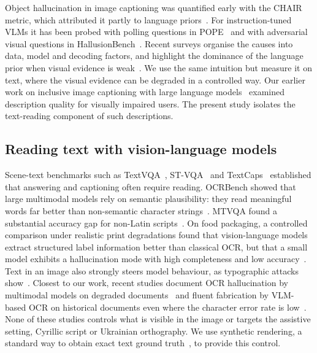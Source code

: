 Object hallucination in image captioning was quantified early with the CHAIR metric, which attributed it partly to language priors~\cite{rohrbach2018object}. For instruction-tuned VLMs it has been probed with polling questions in POPE~\cite{li2023evaluating} and with adversarial visual questions in HallusionBench~\cite{guan2024hallusionbench}. Recent surveys organise the causes into data, model and decoding factors, and highlight the dominance of the language prior when visual evidence is weak~\cite{bai2024hallucination,liu2024survey}. We use the same intuition but measure it on text, where the visual evidence can be degraded in a controlled way. Our earlier work on inclusive image captioning with large language models~\cite{zatserkovnyi2025llm} examined description quality for visually impaired users. The present study isolates the text-reading component of such descriptions.

\subsection{Reading text with vision-language models}

Scene-text benchmarks such as TextVQA~\cite{singh2019towards}, ST-VQA~\cite{biten2019scene} and TextCaps~\cite{sidorov2020textcaps} established that answering and captioning often require reading. OCRBench showed that large multimodal models rely on semantic plausibility: they read meaningful words far better than non-semantic character strings~\cite{liu2024ocrbench}. MTVQA found a substantial accuracy gap for non-Latin scripts~\cite{tang2025mtvqa}. On food packaging, a controlled comparison under realistic print degradations found that vision-language models extract structured label information better than classical OCR, but that a small model exhibits a hallucination mode with high completeness and low accuracy~\cite{zatserkovna2026packaging}. Text in an image also strongly steers model behaviour, as typographic attacks show~\cite{cheng2024unveiling}. Closest to our work, recent studies document OCR hallucination by multimodal models on degraded documents~\cite{he2025seeing} and fluent fabrication by VLM-based OCR on historical documents even where the character error rate is low~\cite{gardella2026low}. None of these studies controls what is visible in the image or targets the assistive setting, Cyrillic script or Ukrainian orthography. We use synthetic rendering, a standard way to obtain exact text ground truth~\cite{jaderberg2016reading,gupta2016synthetic}, to provide this control.

